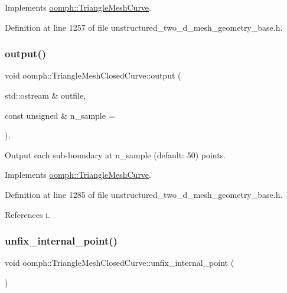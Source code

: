 Implements \hyperlink{classoomph_1_1TriangleMeshCurve_acf002aab11af44361b39729d067efbe2}{oomph\+::\+Triangle\+Mesh\+Curve}.



Definition at line 1257 of file unstructured\+\_\+two\+\_\+d\+\_\+mesh\+\_\+geometry\+\_\+base.\+h.

\mbox{\label{classoomph_1_1TriangleMeshClosedCurve_a246d71ca0cb2dbc9d2c9ad6976f84ba6}} 
\subsubsection{\texorpdfstring{output()}{output()}}
{\footnotesize\ttfamily void oomph\+::\+Triangle\+Mesh\+Closed\+Curve\+::output (\begin{DoxyParamCaption}\item[{std\+::ostream \&}]{outfile,  }\item[{const unsigned \&}]{n\+\_\+sample = {} }\end{DoxyParamCaption})\hspace{0.3cm}{\ttfamily [inline]}, {\ttfamily [virtual]}}



Output each sub-\/boundary at n\+\_\+sample (default\+: 50) points. 



Implements \hyperlink{classoomph_1_1TriangleMeshCurve_a7d40afc7e879fde0319b153a141915df}{oomph\+::\+Triangle\+Mesh\+Curve}.



Definition at line 1285 of file unstructured\+\_\+two\+\_\+d\+\_\+mesh\+\_\+geometry\+\_\+base.\+h.



References i.

\mbox{\label{classoomph_1_1TriangleMeshClosedCurve_a6e05f2fb46166a64f00e5a3a6d7d7a0f}} 
\subsubsection{\texorpdfstring{unfix\+\_\+internal\+\_\+point()}{unfix\_internal\_point()}}
{\footnotesize\ttfamily void oomph\+::\+Triangle\+Mesh\+Closed\+Curve\+::unfix\+\_\+internal\+\_\+point (\begin{DoxyParamCaption}{ }\end{DoxyParamCaption})\hspace{0.3cm}{\ttfamily [inline]}}

